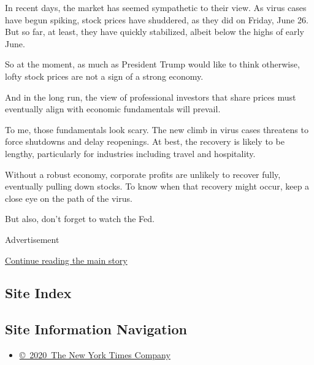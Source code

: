In recent days, the market has seemed sympathetic to their view. As
virus cases have begun spiking, stock prices have shuddered, as they did
on Friday, June 26. But so far, at least, they have quickly stabilized,
albeit below the highs of early June.

So at the moment, as much as President Trump would like to think
otherwise, lofty stock prices are not a sign of a strong economy.

And in the long run, the view of professional investors that share
prices must eventually align with economic fundamentals will prevail.

To me, those fundamentals look scary. The new climb in virus cases
threatens to force shutdowns and delay reopenings. At best, the recovery
is likely to be lengthy, particularly for industries including travel
and hospitality.

Without a robust economy, corporate profits are unlikely to recover
fully, eventually pulling down stocks. To know when that recovery might
occur, keep a close eye on the path of the virus.

But also, don't forget to watch the Fed.

Advertisement

\protect\hyperlink{after-bottom}{Continue reading the main story}

\hypertarget{site-index}{%
\subsection{Site Index}\label{site-index}}

\hypertarget{site-information-navigation}{%
\subsection{Site Information
Navigation}\label{site-information-navigation}}

\begin{itemize}
\tightlist
\item
  \href{https://help.nytimes.com/hc/en-us/articles/115014792127-Copyright-notice}{©~2020~The
  New York Times Company}
\end{itemize}

